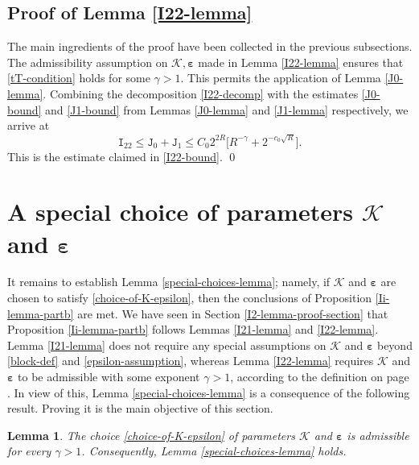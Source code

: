 \documentclass[12pt, twoside]{article}
\newtheorem{lemma}[theorem]{Lemma}
\theoremstyle{definition}
\numberwithin{equation}{section}
\begin{document}
\subsection{Proof of Lemma \ref{I22-lemma}} 
The main ingredients of the proof have been collected in the previous subsections. The admissibility assumption on $\mathcal K, \pmb{\varepsilon}$ made in Lemma \ref{I22-lemma} ensures that \eqref{tT-condition} holds for some $\gamma > 1$. This permits the application of Lemma \ref{J0-lemma}.  Combining the decomposition \eqref{I22-decomp} with the estimates \eqref{J0-bound} and \eqref{J1-bound} from Lemmas \ref{J0-lemma} and \ref{J1-lemma} respectively, we arrive at 
\[ \mathtt I_{22} \leq \mathtt J_0 + \mathtt J_1 \leq C_0 2^{2R} \bigl[ R^{-\gamma} + 2^{-c_0 \sqrt{R}}\bigr]. \] 
This is the estimate claimed in \eqref{I22-bound}. 
\qed
\section{A special choice of parameters $\mathcal K$ and $\pmb{\varepsilon}$} \label{special-choices-section} 
It remains to establish Lemma \ref{special-choices-lemma}; namely, if $\mathcal K$ and $\pmb{\varepsilon}$ are chosen to satisfy \eqref{choice-of-K-epsilon}, then the conclusions of Proposition \ref{Ii-lemma-partb} are met. We have seen in Section \ref{I2-lemma-proof-section} that Proposition \ref{Ii-lemma-partb} follows Lemmas \ref{I21-lemma} and \ref{I22-lemma}. Lemma \ref{I21-lemma} does not require any special assumptions on $\mathcal K$ and $\pmb{\varepsilon}$ beyond \eqref{block-def} and \eqref{epsilon-assumption}, whereas Lemma \ref{I22-lemma} requires $\mathcal K$ and $\pmb{\varepsilon}$ to be admissible with some exponent $\gamma > 1$, according to the definition on page \pageref{tT-condition}. In view of this, Lemma \ref{special-choices-lemma} is a consequence of the following result. Proving it is the main objective of this section. 
\begin{lemma} \label{K-epsilon-verification-lemma} 
The choice \eqref{choice-of-K-epsilon} of parameters $\mathcal K$ and $\pmb{\varepsilon}$ is admissible for every $\gamma > 1$. Consequently, Lemma \ref{special-choices-lemma} holds.  
\end{lemma} 
\end{document}
